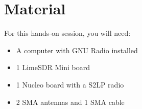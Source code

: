 \section*{Material}

For this hands-on session, you will need:
\begin{itemize}
    \item A computer with GNU Radio installed
    \item 1 LimeSDR Mini board
    \item 1 Nucleo board with a S2LP radio
    \item 2 SMA antennas and 1 SMA cable
\end{itemize}
